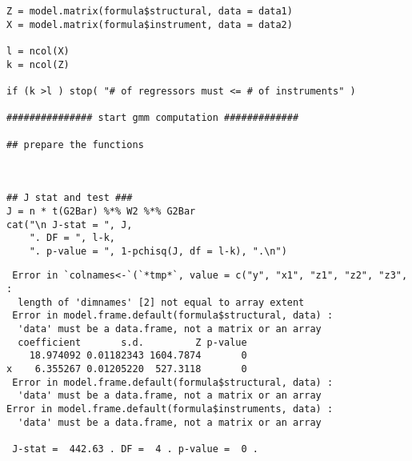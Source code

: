 \documentclass{article}
\begin{document}
\begin{verbatim}
Z = model.matrix(formula$structural, data = data1)
X = model.matrix(formula$instrument, data = data2)

l = ncol(X)
k = ncol(Z)

if (k >l ) stop( "# of regressors must <= # of instruments" )

############### start gmm computation #############

## prepare the functions



## J stat and test ###
J = n * t(G2Bar) %*% W2 %*% G2Bar
cat("\n J-stat = ", J, 
    ". DF = ", l-k, 
    ". p-value = ", 1-pchisq(J, df = l-k), ".\n")
\end{verbatim}


\begin{verbatim}
 Error in `colnames<-`(`*tmp*`, value = c("y", "x1", "z1", "z2", "z3",  : 
  length of 'dimnames' [2] not equal to array extent
 Error in model.frame.default(formula$structural, data) : 
  'data' must be a data.frame, not a matrix or an array
  coefficient       s.d.         Z p-value
    18.974092 0.01182343 1604.7874       0
x    6.355267 0.01205220  527.3118       0
 Error in model.frame.default(formula$structural, data) : 
  'data' must be a data.frame, not a matrix or an array
Error in model.frame.default(formula$instruments, data) : 
  'data' must be a data.frame, not a matrix or an array
 
 J-stat =  442.63 . DF =  4 . p-value =  0 .
\end{verbatim}
\end{document}

